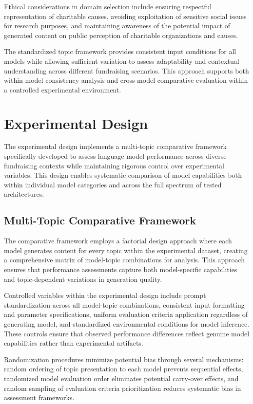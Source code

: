 Ethical considerations in domain selection include ensuring respectful representation of charitable causes, avoiding exploitation of sensitive social issues for research purposes, and maintaining awareness of the potential impact of generated content on public perception of charitable organizations and causes.

The standardized topic framework provides consistent input conditions for all models while allowing sufficient variation to assess adaptability and contextual understanding across different fundraising scenarios. This approach supports both within-model consistency analysis and cross-model comparative evaluation within a controlled experimental environment.

\section{Experimental Design}
\label{sec:experimental-design}

The experimental design implements a multi-topic comparative framework specifically developed to assess language model performance across diverse fundraising contexts while maintaining rigorous control over experimental variables. This design enables systematic comparison of model capabilities both within individual model categories and across the full spectrum of tested architectures.

\subsection{Multi-Topic Comparative Framework}

The comparative framework employs a factorial design approach where each model generates content for every topic within the experimental dataset, creating a comprehensive matrix of model-topic combinations for analysis. This approach ensures that performance assessments capture both model-specific capabilities and topic-dependent variations in generation quality.

Controlled variables within the experimental design include prompt standardization across all model-topic combinations, consistent input formatting and parameter specifications, uniform evaluation criteria application regardless of generating model, and standardized environmental conditions for model inference. These controls ensure that observed performance differences reflect genuine model capabilities rather than experimental artifacts.

Randomization procedures minimize potential bias through several mechanisms: random ordering of topic presentation to each model prevents sequential effects, randomized model evaluation order eliminates potential carry-over effects, and random sampling of evaluation criteria prioritization reduces systematic bias in assessment frameworks.

